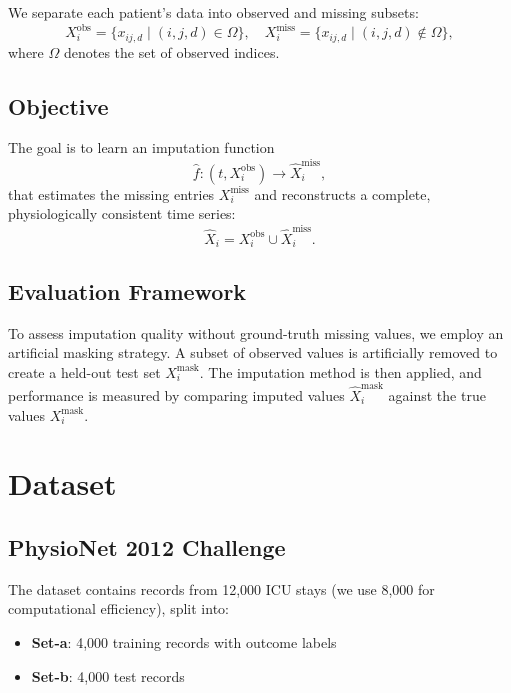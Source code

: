 \documentclass[11pt]{article}
\begin{document}
We separate each patient's data into observed and missing subsets:
\begin{equation}
X^{\text{obs}}_i = \{x_{ij,d} \mid (i,j,d) \in \Omega\}, \quad X^{\text{miss}}_i = \{x_{ij,d} \mid (i,j,d) \notin \Omega\},
\end{equation}
where $\Omega$ denotes the set of observed indices.

\subsection{Objective}
The goal is to learn an imputation function
\begin{equation}
\hat{f}: (t, X^{\text{obs}}_i) \rightarrow \hat{X}^{\text{miss}}_i,
\end{equation}
that estimates the missing entries $X^{\text{miss}}_i$ and reconstructs a complete, physiologically consistent time series:
\begin{equation}
\hat{X}_i = X^{\text{obs}}_i \cup \hat{X}^{\text{miss}}_i.
\end{equation}

\subsection{Evaluation Framework}
To assess imputation quality without ground-truth missing values, we employ an artificial masking strategy. A subset of observed values is artificially removed to create a held-out test set $X^{\text{mask}}_i$. The imputation method is then applied, and performance is measured by comparing imputed values $\hat{X}^{\text{mask}}_i$ against the true values $X^{\text{mask}}_i$.

\section{Dataset}

\subsection{PhysioNet 2012 Challenge}
The dataset contains records from 12,000 ICU stays (we use 8,000 for computational efficiency), split into:
\begin{itemize}[noitemsep]
    \item \textbf{Set-a}: 4,000 training records with outcome labels
    \item \textbf{Set-b}: 4,000 test records
\end{itemize}
\end{document}
